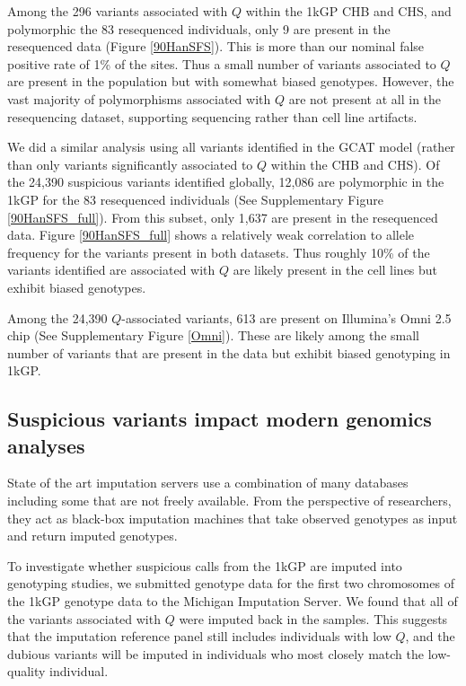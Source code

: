\documentclass[9pt,lineno]{elife}
\begin{document}
Among the 296 variants associated with $Q$ within the 1kGP CHB and CHS, and polymorphic the 83 resequenced individuals, only 9 are present in the resequenced data (Figure \ref{90HanSFS}). 
This is more than our nominal false positive rate of 1\% of the sites. Thus a small number of variants associated to $Q$ are present in the population but with somewhat biased genotypes. 
However, the vast majority of polymorphisms associated with $Q$ are not present at all in the resequencing dataset, supporting sequencing rather than cell line artifacts.


We did a similar analysis using all variants identified in the GCAT model (rather than only variants significantly associated to $Q$ within the CHB and CHS). 
Of the 24,390 suspicious variants identified globally, 12,086 are polymorphic in the 1kGP for the 83 resequenced individuals  (See Supplementary Figure \ref{90HanSFS_full}).
From this subset, only 1,637 are present in the resequenced data.
Figure \ref{90HanSFS_full} shows a relatively weak correlation to allele frequency for the variants present in both datasets.
Thus roughly 10\% of the variants identified are associated with $Q$ are likely present in the cell lines but exhibit biased genotypes.


Among the 24,390 $Q$-associated variants, 613 are present on Illumina's Omni 2.5 chip (See Supplementary Figure \ref{Omni}). 
These are likely among the small number of variants that are present in the data but exhibit biased genotyping in 1kGP. 

\subsection{Suspicious variants impact modern genomics analyses}

State of the art imputation servers use a combination of many databases including some that are not freely available.
From the perspective of researchers, they act as black-box imputation machines that take observed genotypes as input and return imputed genotypes.  

To investigate whether suspicious calls from the 1kGP are imputed into genotyping studies, we submitted genotype data for the first two chromosomes of the 1kGP genotype data to the Michigan Imputation Server.
We found that all of the variants associated with $Q$ were imputed back in the samples.
This suggests that the imputation reference panel still includes individuals with low $Q$, and the dubious variants will be imputed in individuals who most closely match the low-quality individual.
\end{document}
